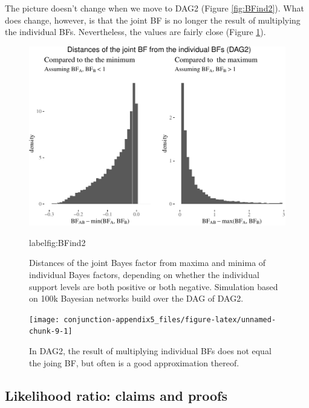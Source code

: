 \documentclass[
  10pt,
  dvipsnames,enabledeprecatedfontcommands]{scrartcl}
\begin{document}
The picture doesn't change when we move to \textsf{DAG2} (Figure
\ref{fig:BFind2}). What does change, however, is that the joint BF is no
longer the result of multiplying the individual BFs. Nevertheless, the
values are fairly close (Figure \ref{fig:BFmulti}).

\vspace{1mm}
\footnotesize

\normalsize

\begin{figure}[ht]

\begin{center}\includegraphics[width=1\linewidth]{conjunction-appendix5_files/figure-latex/BFind2-1} \end{center}

\caption{Distances of the joint Bayes factor from maxima and minima of individual Bayes factors, depending on whether the individual support levels are both positive or both negative. Simulation based on 100k Bayesian networks build over the DAG of \textsf{DAG2}.}
label{fig:BFind2}
\end{figure}

\begin{figure}[ht]

\begin{center}\texttt{[image: conjunction-appendix5\_files/figure-latex/unnamed-chunk-9-1]} \end{center}
\caption{In DAG2, the result of multiplying individual BFs does not equal the joing BF, but often is a good approximation thereof.}
\label{fig:BFmulti}
\end{figure}

\hypertarget{likelihood-ratio-claims-and-proofs}{%
\subsection*{Likelihood ratio: claims and
proofs}\label{likelihood-ratio-claims-and-proofs}}
\end{document}
